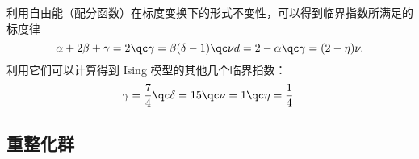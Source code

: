 %
%
%

利用自由能（配分函数）在标度变换下的形式不变性，可以得到临界指数所满足的标度律
\begin{equation}
  \alpha + 2\beta + \gamma = 2 \qc
  \gamma = \beta (\delta - 1)  \qc
  \nu d = 2 - \alpha           \qc
  \gamma = (2-\eta) \nu.
\end{equation}
利用它们可以计算得到 Ising 模型的其他几个临界指数：
\begin{equation}
  \gamma = \frac{7}{4} \qc
  \delta = 15          \qc
  \nu    = 1           \qc
  \eta   = \frac{1}{4}.
\end{equation}

\subsection{重整化群}

